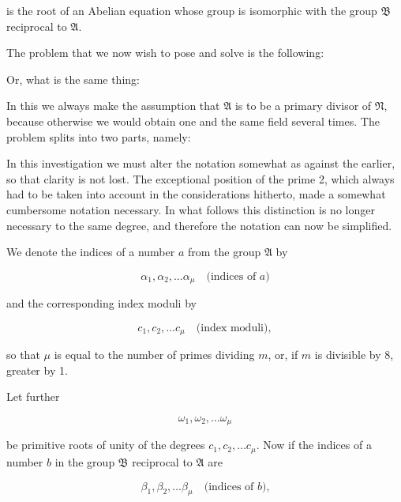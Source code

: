 
is the root of an Abelian equation whose group is isomorphic with the group $\mathfrak{B}$ reciprocal to $\mathfrak{A}$.

The problem that we now wish to pose and solve is the following:


Or, what is the same thing:


In this we always make the assumption that $\mathfrak{A}$ is to be a primary divisor of $\mathfrak{N}$, because otherwise we would obtain one and the same field several times. The problem splits into two parts, namely:



In this investigation we must alter the notation somewhat as against the earlier, so that clarity is not lost. The exceptional position of the prime 2, which always had to be taken into account in the considerations hitherto, made a somewhat cumbersome notation necessary. In what follows this distinction is no longer necessary to the same degree, and therefore the notation can now be simplified.

We denote the indices of a number $a$ from the group $\mathfrak{A}$ by

\[
\alpha_1, \alpha_2, \dots \alpha_\mu \quad \text{(indices of $a$)}
\]

and the corresponding index moduli by

\[
c_1, c_2, \dots c_\mu \quad \text{(index moduli)},
\]

so that $\mu$ is equal to the number of primes dividing $m$, or, if $m$ is divisible by 8, greater by 1.

Let further

\[
\omega_1, \omega_2, \dots \omega_\mu
\]

be primitive roots of unity of the degrees $c_1, c_2, \dots c_\mu$. Now if the indices of a number $b$ in the group $\mathfrak{B}$ reciprocal to $\mathfrak{A}$ are

\[
\beta_1, \beta_2, \dots \beta_\mu \quad \text{(indices of $b$),}
\]
